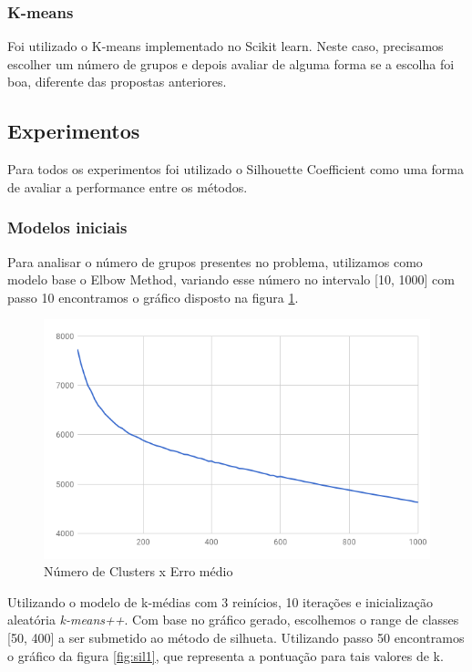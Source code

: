 \documentclass[conference]{IEEEtran}
\begin{document}
\subsubsection{K-means}
Foi utilizado o K-means implementado no Scikit learn. Neste caso, precisamos escolher um número de grupos e depois avaliar de alguma forma se a escolha foi boa, diferente das propostas anteriores.

\subsection{Experimentos}
Para todos os experimentos foi utilizado o Silhouette Coefficient como uma forma de avaliar a performance entre os métodos. 

\subsubsection{Modelos iniciais}
Para analisar o número de grupos presentes no problema, utilizamos como modelo base o Elbow Method, variando esse número no intervalo [10, 1000] com passo 10 encontramos o gráfico disposto na figura \ref{fig:elbow}. 

\begin{figure}[H]
  \includegraphics[scale=0.4, center]{elbow.png}
  \caption{Número de Clusters x Erro médio}
  \label{fig:elbow}
\end{figure}

Utilizando o modelo de k-médias com 3 reinícios, 10 iterações e inicialização aleatória \textit{k-means++}. Com base no gráfico gerado, escolhemos o range de classes [50, 400] a ser submetido ao método de silhueta. Utilizando passo 50 encontramos o gráfico da figura \ref{fig:sil1}, que representa a pontuação para tais valores de k.
\end{document}
